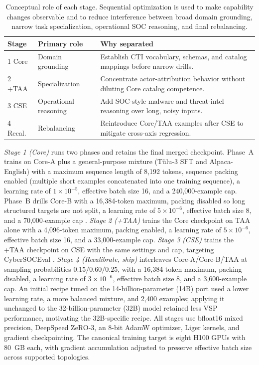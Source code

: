 \documentclass[conference]{IEEEtran}
\begin{document}
\begin{table}[t]
\centering
\caption{Conceptual role of each stage. Sequential optimization is used to make capability changes observable and to reduce interference between broad domain grounding, narrow task specialization, operational SOC reasoning, and final rebalancing.}
\label{tab:stage-rationale}
\footnotesize
\setlength{\tabcolsep}{3pt}
\begin{tabular}{p{1.05cm}p{2.0cm}p{3.65cm}}
\hline
\textbf{Stage} & \textbf{Primary role} & \textbf{Why separated} \\
\hline
1 Core & Domain grounding & Establish CTI vocabulary, schemas, and catalog mappings before narrow drills. \\
2 +TAA & Specialization & Concentrate actor-attribution behavior without diluting Core catalog competence. \\
3 CSE & Operational reasoning & Add SOC-style malware and threat-intel reasoning over long, noisy inputs. \\
4 Recal. & Rebalancing & Reintroduce Core/TAA examples after CSE to mitigate cross-axis regression. \\
\hline
\end{tabular}
\end{table}

\emph{Stage 1 (Core)} runs two phases and retains the final merged checkpoint. Phase~A trains on Core-A plus a general-purpose mixture (Tülu-3 SFT and Alpaca-English) with a maximum sequence length of 8,192 tokens, sequence packing enabled (multiple short examples concatenated into one training sequence), a learning rate of $1\times10^{-5}$, effective batch size 16, and a 240,000-example cap. Phase~B drills Core-B with a 16,384-token maximum, packing disabled so long structured targets are not split, a learning rate of $5\times10^{-6}$, effective batch size 8, and a 70,000-example cap \cite{athenabench2025,chung2022flant5,gururangan2020dontstop}. \emph{Stage 2 (+TAA)} trains the Core checkpoint on TAA alone with a 4,096-token maximum, packing enabled, a learning rate of $5\times10^{-6}$, effective batch size 16, and a 33,000-example cap. \emph{Stage 3 (CSE)} trains the +TAA checkpoint on CSE with the same settings and cap, targeting CyberSOCEval \cite{cybersoceval2025}. \emph{Stage 4 (Recalibrate, ship)} interleaves Core-A/Core-B/TAA at sampling probabilities $0.15/0.60/0.25$, with a 16,384-token maximum, packing disabled, a learning rate of $3\times10^{-6}$, effective batch size 8, and a 3,600-example cap. An initial recipe tuned on the 14-billion-parameter (14B) port used a lower learning rate, a more balanced mixture, and 2,400 examples; applying it unchanged to the 32-billion-parameter (32B) model retained less VSP performance, motivating the 32B-specific recipe. All stages use bfloat16 mixed precision, DeepSpeed ZeRO-3, an 8-bit AdamW optimizer, Liger kernels, and gradient checkpointing. The canonical training target is eight H100 GPUs with 80~GB each, with gradient accumulation adjusted to preserve effective batch size across supported topologies.
\end{document}
